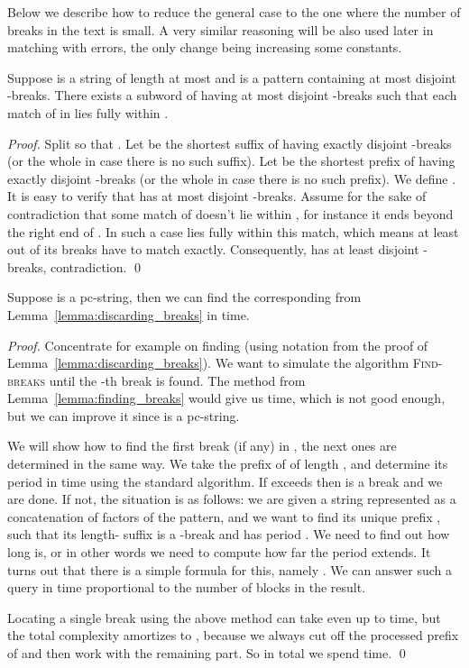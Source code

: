 \documentclass[runningheads]{llncs}
\newcommand{\proc}[1]{\textnormal{\scshape#1}}
\begin{document}
Below we describe how to reduce the general case to the one where the number of breaks in the text is small. A very similar reasoning will be also used later in matching with errors, the only change being increasing some constants.

\begin{lemma}\label{lemma:discarding_breaks}
Suppose  is a string of length at most  and  is a pattern containing at most  disjoint -breaks. There exists a subword  of  having at most  disjoint -breaks such that each match of  in  lies fully within .
\end{lemma}
\begin{proof}
Split  so that . Let  be the shortest suffix of  having exactly  disjoint -breaks (or the whole  in case there is no such suffix). Let  be the shortest prefix of  having exactly  disjoint -breaks (or the whole  in case there is no such prefix). We define . It is easy to verify that  has at most  disjoint -breaks. Assume for the sake of contradiction that some match of  doesn't lie within , for instance it ends beyond the right end of . In such a case  lies fully within this match, which means at least  out of its  breaks have to match exactly. Consequently,  has at least  disjoint -breaks, contradiction.
\qed
\end{proof}

\begin{proposition}\label{proposition:algorithm_text_breaks}
Suppose  is a pc-string, then we can find the corresponding  from Lemma~\ref{lemma:discarding_breaks} in  time.
\end{proposition}
\begin{proof}
Concentrate for example on finding  (using notation from the proof of Lemma~\ref{lemma:discarding_breaks}). We want to simulate the algorithm \proc{Find-breaks} until the -th break is found. The method from Lemma~\ref{lemma:finding_breaks} would give us  time, which is not good enough, but we can improve it since  is a pc-string. 

We will show how to find the first break (if any) in , the next ones are determined in the same way. We take the prefix  of  of length , and determine its period  in  time using the standard algorithm. If  exceeds  then  is a break and we are done. If not, the situation is as follows: we are given a string  represented as a concatenation of  factors of the pattern, and we want to find its unique prefix , such that its length- suffix is a -break and  has period .  We need to find out how long  is, or in other words we need to compute how far the period  extends. It turns out that there is a simple formula for this, namely . We can answer such a query in time proportional to the number of blocks in the result. 

Locating a single break using the above method can take even up to  time, but the total complexity amortizes to , because we always cut off the processed prefix of  and then work with the remaining part. So in total we spend  time. 
\qed
\end{proof}
\end{document}
